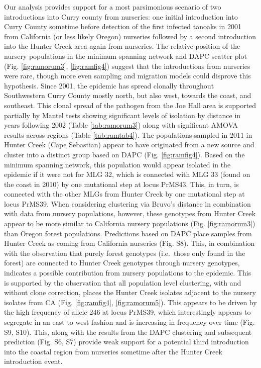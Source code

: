 \documentclass[double,12pt]{beavtex}
\begin{document}
  Our analysis provides support for a most parsimonious scenario of two
  introductions into Curry county from nurseries: one initial introduction
  into Curry County sometime before detection of the first infected
  tanoaks in 2001 from California (or less likely Oregon) nurseries
  followed by a second introduction into the Hunter Creek area again from
  nurseries. The relative position of the nursery populations in the
  minimum spanning network and DAPC scatter plot (Fig. \ref{fig:ramorum3},
  \ref{fig:ramfig4}) suggest that the introductions from nurseries were
  rare, though more even sampling and migration models could disprove this
  hypothesis. Since 2001, the epidemic has spread clonally throughout
  Southwestern Curry County mostly north, but also west, towards the
  coast, and southeast. This clonal spread of the pathogen from the Joe
  Hall area is supported partially by Mantel tests showing significant
  levels of isolation by distance in years following 2002 (Table
  \ref{tab:ramorum3}) along with significant AMOVA results across regions
  (Table \ref{tab:ramtab4}). The populations sampled in 2011 in Hunter
  Creek (Cape Sebastian) appear to have originated from a new source and
  cluster into a distinct group based on DAPC (Fig. \ref{fig:ramfig4}).
  Based on the minimum spanning network, this population would appear
  isolated in the epidemic if it were not for MLG 32, which is connected
  with MLG 33 (found on the coast in 2010) by one mutational step at locus
  PrMS43. This, in turn, is connected with the other MLGs from Hunter
  Creek by one mutational step at locus PrMS39. When considering
  clustering via Bruvo's distance in combination with data from nursery
  populations, however, these genotypes from Hunter Creek appear to be
  more similar to California nursery populations (Fig. \ref{fig:ramorum3})
  than Oregon forest populations. Predictions based on DAPC place samples
  from Hunter Creek as coming from California nurseries (Fig. S8). This,
  in combination with the observation that purely forest genotypes
  (i.e.~those only found in the forest) are connected to Hunter Creek
  genotypes through nursery genotypes, indicates a possible contribution
  from nursery populations to the epidemic. This is supported by the
  observation that all population level clustering, with and without clone
  correction, places the Hunter Creek isolates adjacent to the nursery
  isolates from CA (Fig. \ref{fig:ramfig4}, \ref{fig:ramorum5}). This
  appears to be driven by the high frequency of allele 246 at locus
  PrMS39, which interestingly appears to segregate in an east to west
  fashion and is increasing in frequency over time (Fig. S9, S10). This,
  along with the results from the DAPC clustering and subsequent
  prediction (Fig. S6, S7) provide weak support for a potential third
  introduction into the coastal region from nurseries sometime after the
  Hunter Creek introduction event.
  
\end{document}
